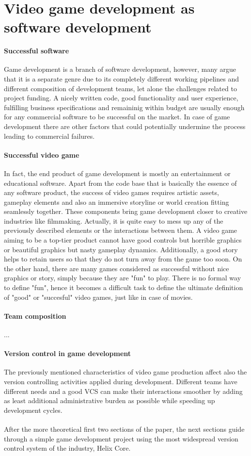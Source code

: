 \section{Video game development as software development} \label{game-development-sw}
\paragraph{Successful software}
Game development is a branch of software development, however, many argue that it is a separate genre
due to its completely different working pipelines and different composition of development teams, let alone the challenges 
related to project funding. A nicely written code, good functionality and user experience, fulfilling business specifications 
and remaininig within budget are usually enough for any commercial software to be successful on the market. In case of game 
development there are other factors that could potentially undermine the process leading to commercial failures.
\paragraph{Successful video game}
In fact, the end product of game development is mostly an entertainment or educational software. Apart from the code 
base that is basically the essence of any software product, the success of video games requires artistic assets, 
gameplay elements and also an immersive storyline or world creation fitting seamlessly together.
These components bring game development closer to creative industries like filmmaking. Actually, it is quite easy to mess
up any of the previously described elements or the interactions between them. 
A video game aiming to be a top-tier product cannot have good controls but horrible graphics
or beautiful graphics but nasty gameplay dynamics. Additionally, a good story helps to retain users so that
they do not turn away from the game too soon. On the other hand, there are many games considered as successful without
nice graphics or story, simply because they are "fun" to play. There is no formal way to define "fun", hence it becomes
a difficult task to define the ultimate definition of "good" or "succesful" video games, just like in case of movies.
\paragraph{Team composition}
...
\paragraph{Version control in game development}
The previously mentioned characteristics of video game production affect also the version controlling activities applied
during development. Different teams have different needs and a good VCS can make their interactions smoother by adding
as least additional administrative burden as possible while speeding up development cycles.

\paragraph{}
After the more theoretical first two sections of the paper, the next sections guide through a simple game development
project using the most widespread version control system of the industry, 
Helix Core\textsuperscript{\texttrademark}.